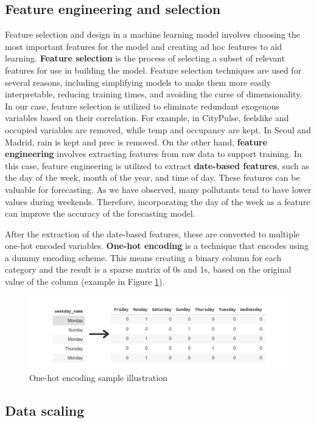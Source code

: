 \subsection{Feature engineering and selection}
Feature selection and design in a machine learning model involves choosing the most important features for the model and creating ad hoc features to aid learning. 
\textbf{Feature selection} is the process of selecting a subset of relevant features for use in building the model.
Feature selection techniques are used for several reasons, including simplifying models to make them more easily interpretable, reducing training times, and avoiding the curse of dimensionality.
In our case, feature selection is utilized to eliminate redundant exogenous variables based on their correlation.
For example, in CityPulse, feelslike and occupied variables are removed, while temp and occupancy are kept. In Seoul and Madrid, rain is kept and prec is removed.
On the other hand, \textbf{feature engineering} involves extracting features from raw data to support training.
In this case, feature engineering is utilized to extract \textbf{date-based features}, such as the day of the week, month of the year, and time of day. These features can be valuable for forecasting. As we have observed, many pollutants tend to have lower values during weekends. Therefore, incorporating the day of the week as a feature can improve the accuracy of the forecasting model.


After the extraction of the date-based features, these are converted to multiple one-hot encoded variables. \textbf{One-hot encoding} is a technique that encodes using a dummy encoding scheme. This means creating a binary column for each category and the result is a sparse matrix of 0s and 1s, based on the original value of the column (example in Figure \ref{fig:one-hot}).
\begin{figure}
    \centering
    \includegraphics[width=0.75\linewidth]{images/onehotencoding.png}
    \caption{One-hot encoding sample illustration \cite{onehotencoding}}
    \label{fig:one-hot}
\end{figure}

\subsection{Data scaling}

